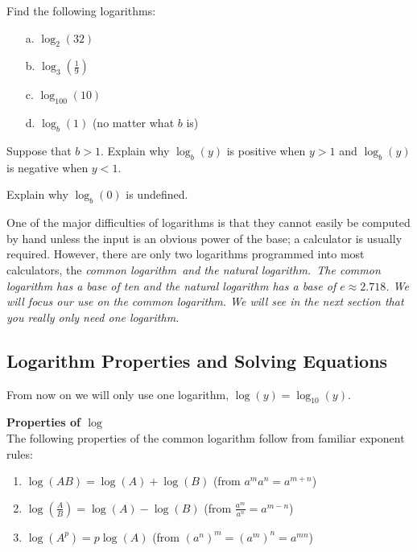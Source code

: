 \begin{eg}
\begin{question} Find the following logarithms:
\begin{enumerate}
\item[a.] $\log_{2}(32)$
\item[b.] $\log_{3}\left(\frac{1}{9}\right)$
\item[c.] $\log_{100}(10)$
\item[d.] $\log_{b}(1)$ (no matter what $b$ is)
\end{enumerate}
\end{question}

\begin{question} Suppose that $b>1$. Explain why $\log_{b}(y)$ is positive when $y>1$ and $\log_{b}(y)$ is negative when $y<1$.
\end{question}

\par

\begin{question} Explain why $\log_b(0)$ is undefined.
\end{question}

\par

One of the major difficulties of logarithms is that they cannot easily be computed by hand unless the input is an obvious power of the base; a calculator is usually required. However, there are only two logarithms programmed into most calculators, the \it{common logarithm}\ \normalfont and the \it{natural logarithm}.\ \normalfont The common logarithm has a base of ten and the natural logarithm has a base of $e \approx 2.718$. We will focus our use on the common logarithm. We will see in the next section that you really only need one logarithm. 

\subsection{Logarithm Properties and Solving Equations}

From now on we will only use one logarithm, $\log(y) = \log_{10}(y)$.


\begin{tcolorbox}
{\bf Properties of $\log$}\\
The following properties of the common logarithm follow from familiar exponent rules:
\begin{enumerate}
\item $\log(AB) = \log(A) + \log(B)$ (from $a^{m}a^{n} = a^{m+n}$) 
\item $\log\left(\frac{A}{B}\right) = \log(A) - \log(B)$ (from $\frac{a^{m}}{a^{n}} = a^{m-n}$) 
\item $\log(A^p) = p\log(A)$ (from $(a^{n})^m = (a^{m})^n = a^{mn}$) 
\end{enumerate}
\end{tcolorbox}


\end{eg}

